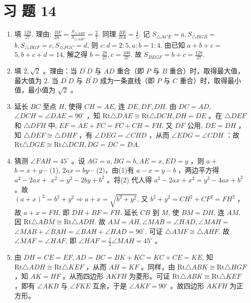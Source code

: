 \documentclass[10pt]{article}
\begin{document}
\section*{习 题 14}
\begin{enumerate}
  \item 填 $\frac{128}{27}$. 理由: $\frac{B F}{B C}=\frac{S_{\triangle A B F}}{S_{\triangle A B C}}=\frac{2}{7}$. 同理 $\frac{B E}{B A}=\frac{4}{5}$. 记 $S_{\triangle A C E}=a, S_{\triangle B G B}=$ $b, S_{\triangle B G F}=c, S_{\triangle F G C}=d$, 则 $c: d=2: 5, a: b=1: 4$. 由已知 $a+b+c=$ $5, b+c+d=14$, 解之得 $b=\frac{28}{27}, c=\frac{100}{27}$. 故 $S_{B E G F}=b+c=\frac{128}{27}$.
  \item 填 $2, \sqrt{2}$ 。理由：当 $D^{\prime} D$ 与 $A D$ 重合（即 $P$ 与 $B$ 重合）时，取得最大值，最大值为 2. 当 $D^{\prime} D$ 与 $B^{\prime} D$ 成为一条直线（即 $P$ 与 $C$ 重合）时，取得最小值，最小值为 $\sqrt{2}$ 。
  \item 延长 $B C$ 至点 $H$, 使得 $C H=A E$, 连 $D E, D F, D H$. 由 $D C=A D$, $\angle D C H=\angle D A E=90^{\circ}$ ，知 $\mathrm{Rt} \triangle D A E \cong \mathrm{Rt} \triangle D C H, D H=D E$ 。在 $\triangle D E F$和 $\triangle D F H$ 中, $E F=A E+F C=F C+C H=F H$. 又 $D F$ 公用, $D E=D H$ ，知 $\triangle D E F \cong \triangle D H F$ ，有 $\angle D E G=\angle C H D$ ，从而 $\angle E D G=\angle C D H$ ：故 $\mathrm{Rt} \triangle D G E \cong \mathrm{Rt} \triangle D C H, D G=D C=D A$.
  \item 猜测 $\angle F A H=45^{\circ}$ 。设 $A G=a, B G=b, A E=x, E D=y$ ，则 $a+$ $b=x+y \cdots$ (1), $2 a x=b y \cdots$ (2)，由(1)有 $a-x=y-b$ ，两边平方得 $a^{2}-2 a x+$ $x^{2}=y^{2}-2 b y+b^{2}$ 。将(2) 代人得 $a^{2}-2 a x+x^{2}=y^{2}-4 a x+b^{2}$ 。故\\
$(a+x)^{2}=b^{2}+y^{2} \Rightarrow a+x=\sqrt{b^{2}+y^{2}}$. 又 $b^{2}+y^{2}=C H^{2}+C F^{2}=F H^{2}$ ，故 $a+x=F H$, 即 $D H+B F=F H$. 延长 $C B$ 到 $M$, 使 $B M=D H$, 连 $A M$. 因 $\mathrm{Rt} \triangle A B M \cong \mathrm{Rt} \triangle A D H$. 故 $A M=A H, \angle M A B=\angle H A D, \angle M A H=$ $\angle M A B+\angle B A H=\angle B A H+\angle H A D=90^{\circ}$. 可证 $\triangle A M F \cong \triangle A H F$. 故 $\angle M A F=\angle H A F$, 即 $\angle H A F=\frac{1}{2} \angle M A H=45^{\circ}$ 。
  \item 由 $D H=C E=E F, A D=B C=B K+K C=K C+C E=K E$, 知 $\mathrm{Rt} \triangle A D H \cong \mathrm{Rt} \triangle K E F$ ，从而 $A H=K F$ 。同样，由 $\mathrm{Rt} \triangle A B K \cong \mathrm{Rt} \triangle H G F$ ，知 $A K=H F$ 。从而四边形 $A K F H$ 为菱形。可证 $\mathrm{Rt} \triangle A B K \cong \mathrm{Rt} \triangle K E F$ ，即有 $\angle A K B$ 与 $\angle F K E$ 互余，于是 $\angle A K F=90^{\circ}$ 。故四边形 $A K F H$ 为正方形。

\end{enumerate}
\end{document}
